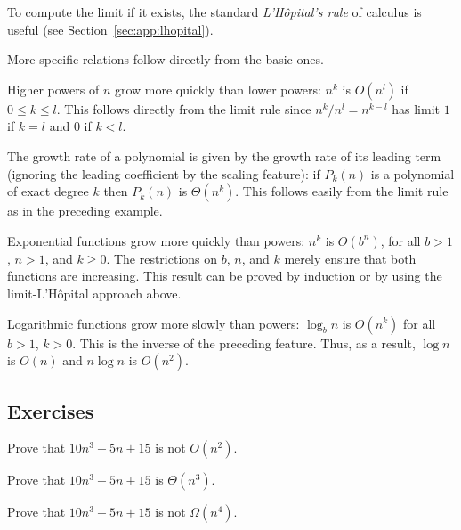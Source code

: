 To compute the limit if it exists, the standard \emph{L'H\^{o}pital's rule}
of calculus is useful (see Section~\ref{sec:app:lhopital}).

More specific relations follow directly from the basic ones.

\begin{Example} 
\label{ex:powers}
Higher powers of $n$ grow more quickly than lower powers:
$n^{k}$ is $O(n^{l})$ if $0 \le k \le l$. This follows directly from the limit rule
since $n^k/n^l = n^{k-l}$ has limit $1$ if $k=l$ and $0$ if $k<l$.
\end{Example}

\begin{Example}  
The growth rate of a polynomial is given by the growth rate of its leading 
term (ignoring the leading coefficient by the scaling feature): 
if $P_{k}(n)$ is a polynomial of exact degree $k$ then $P_{k}(n)$ is $\Theta(n^{k})$. 
This follows easily from the limit rule as in the preceding example.
\end{Example}


\begin{Example}  
Exponential functions grow more quickly than powers: 
$n^{k}$ is $O(b^{n})$, for all $b>1$, $n>1$, and $k \ge 0$. 
The restrictions on $b$, $n$, and $k$ merely ensure that both 
functions are increasing. This result can be proved by induction or by using the 
limit-L'H\^{o}pital approach above.
\end{Example}

\begin{Example}  
Logarithmic functions grow more slowly than powers: 
$\log_{b} n$ is $O(n^{k})$ for all $b>1$, $k > 0$. 
This is the inverse of the preceding feature. Thus, 
as a result, $\log n$ is $O(n)$ and $n \log n$ is $O(n^{2})$.  
\end{Example} 

\subsection*{Exercises}

\begin{Exercise}\label{exr:aa:bigO:a}
Prove that $10n^3 - 5n + 15$ is not $O(n^{2})$.
\end{Exercise}
\begin{Exercise}\label{exr:aa:bigO:b}
Prove that $10n^3 - 5n + 15$ is $\Theta(n^{3})$.
\end{Exercise}
\begin{Exercise}\label{exr:aa:bigO:c}
Prove that $10n^3 - 5n + 15$ is not $\Omega(n^{4})$.
\end{Exercise}

